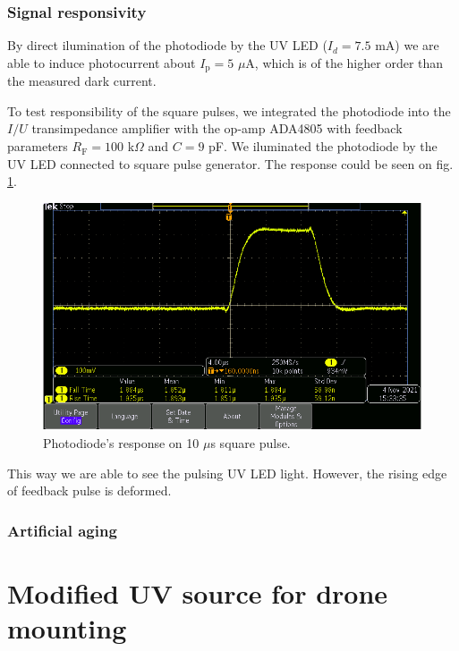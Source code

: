 \subsubsection{Signal responsivity}
By direct ilumination of the photodiode by the UV LED ($I_d = 7.5 $ mA) we are able to induce photocurrent about $I_\textrm{p} = 5$ $\mu$A, which is of the higher order than the measured dark current.
\par
To test responsibility of the square pulses, we integrated the photodiode into the $I/U$ transimpedance amplifier with the op-amp ADA4805 with feedback parameters $R_\textrm{F} = 100$ k$\Omega$ and $C = 9$ pF. We iluminated the photodiode by the UV LED connected to square pulse generator. The response could be seen on fig. \ref{response}.

\begin{figure}[H]
 \centering
 \includegraphics[scale=0.5]{./pictures/pulse}
 \caption{Photodiode's response on 10 $\mu$s square pulse.}
 \label{response}
\end{figure}


This way we are able to see the pulsing UV LED light. However, the rising edge of feedback pulse is deformed. 

\subsubsection{Artificial aging}


\section{Modified UV source for drone mounting}



